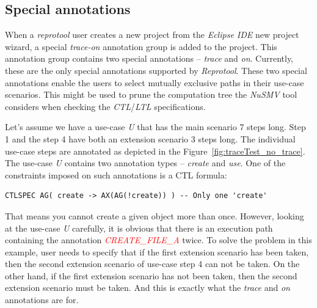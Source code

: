 \subsection{Special annotations}

When a \emph{reprotool} user creates a new project from the \emph{Eclipse IDE} new project wizard, a special \emph{trace-on} annotation group is added to the project.
This annotation group contains two special annotations -- \emph{trace} and \emph{on}.
Currently, these are the only special annotations supported by \emph{Reprotool}.
These two special annotations enable the users to select mutually exclusive paths in their use-case scenarios.
This might be used to prune the computation tree the \emph{NuSMV} tool considers when checking the \emph{CTL}/\emph{LTL} specifications.

Let's assume we have a use-case \emph{U} that has the main scenario 7 steps long.
Step 1 and the step 4 have both an extension scenario 3 steps long.
The individual use-case steps are annotated as depicted in the Figure~\ref{fig:traceTest_no_trace}.
The use-case \emph{U} contains two annotation types -- \emph{create} and \emph{use}.
One of the constraints imposed on such annotations is a CTL formula:
\begin{verbatim}
CTLSPEC AG( create -> AX(AG(!create)) ) -- Only one 'create'
\end{verbatim}

That means you cannot create a given object more than once. However, looking at the use-case \emph{U} carefully, it is obvious that there is an execution path containing  the annotation \textcolor{red}{\emph{CREATE\_FILE\_A}} twice.
To solve the problem in this example, user needs to specify that if the first extension scenario has been taken, then the second extension scenario of use-case step 4 can not be taken. On the other hand, if the first extension scenario has not been taken,
then the second extension scenario must be taken.
And this is exactly what the \emph{trace} and \emph{on} annotations are for.

\newpage

